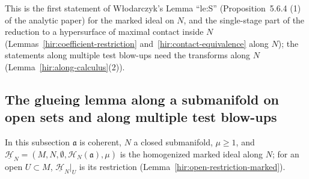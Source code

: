 This is the first statement of Włodarczyk's Lemma ``le:S'' (Proposition~5.6.4 (1) of the analytic paper) for the marked ideal on \(N\), and the single-stage part of
the reduction to a hypersurface of maximal contact inside \(N\) (Lemmas~\ref{hir:coefficient-restriction} and~\ref{hir:contact-equivalence} along \(N\)); the
statements along multiple test blow-ups need the transforms along \(N\) (Lemma~\ref{hir:along-calculus}(2)).

\subsection{The glueing lemma along a submanifold on open sets and along multiple test blow-ups}

In this subsection \(\mathfrak a\) is coherent, \(N\) a closed submanifold, \(\mu\ge1\), and \(\underline{\mathcal H}_N=(M,N,\emptyset,\mathcal H_N(\mathfrak a),\mu)\) is the
homogenized marked ideal along \(N\); for an open \(U\subset M\), \(\underline{\mathcal H}_N|_U\) is its restriction (Lemma~\ref{hir:open-restriction-marked}).

